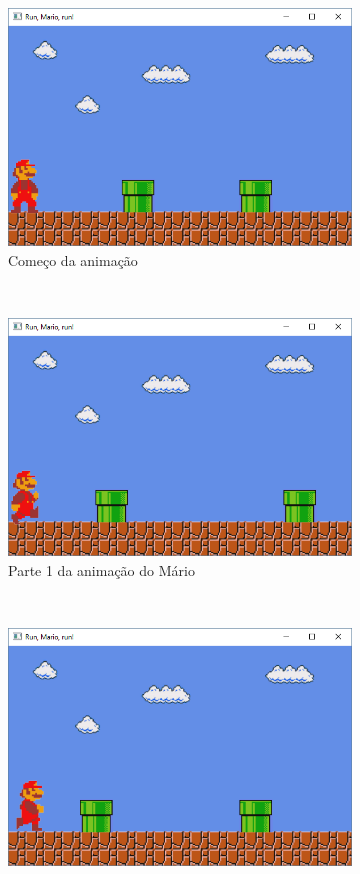 \begin{enumerate}
  \begin{figure}[!htp]
    \centering
    \begin{subfigure}[t]{0.3\textwidth}
        \centerline{\includegraphics[width=.9\textwidth]{img/cap1_ex25}}
        \caption{Começo da animação}
        \label{fig:cap01_ex6a}
    \end{subfigure}
    ~
    \begin{subfigure}[t]{0.3\textwidth}
        \centerline{\includegraphics[width=.9\textwidth]{img/cap1_ex25b}}
        \caption{Parte 1 da animação do Mário}
        \label{fig:cap01_ex6b}
    \end{subfigure}
    ~
    \begin{subfigure}[t]{0.3\textwidth}
        \centerline{\includegraphics[width=.9\textwidth]{img/cap1_ex25c}}

\end{subfigure}
\end{figure}
\end{enumerate}
